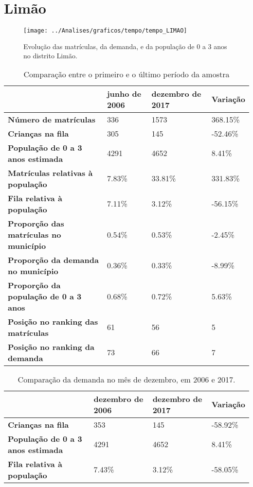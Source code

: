 \section{Limão}
\begin{figure}[H]
\centering
\texttt{[image: ../Analises/graficos/tempo/tempo\_LIMAO]}
\caption{Evolução das matrículas, da demanda, e da população de 0 a 3 anos no distrito Limão.}
\end{figure}
\begin{table}[H]
\begin{tabular}{|l|l|l|l|}
\hline
\textbf{}                                      & \textbf{junho de 2006}       & \textbf{dezembro de 2017}    & \textbf{Variação} \\ \hline
\textbf{Número de matrículas}                  & 336 & 1573 & 368.15\% \\ \hline
\textbf{Crianças na fila}                      & 305 & 145 & -52.46\% \\ \hline
\textbf{População de 0 a 3 anos estimada}      & 4291 & 4652 & 8.41\% \\ \hline
\textbf{Matrículas relativas à população}      & 7.83\% & 33.81\% & 331.83\% \\ \hline
\textbf{Fila relativa à população}             & 7.11\% & 3.12\% & -56.15\% \\ \hline
\textbf{Proporção das matrículas no município} & 0.54\% & 0.53\% & -2.45\% \\ \hline
\textbf{Proporção da demanda no município}     & 0.36\% & 0.33\% & -8.99\% \\ \hline
\textbf{Proporção da população de 0 a 3 anos}  & 0.68\% & 0.72\% & 5.63\% \\ \hline
\textbf{Posição no ranking das matrículas}     & 61 & 56 & 5 \\ \hline
\textbf{Posição no ranking da demanda}         & 73 & 66 & 7 \\ \hline
\end{tabular}
\caption{Comparação entre o primeiro e o último período da amostra}
\end{table}
\begin{table}[H]
\begin{tabular}{|l|l|l|l|}
\hline
\textbf{}                                 & \textbf{dezembro de 2006} & \textbf{dezembro de 2017} & \textbf{Variação} \\ \hline
\textbf{Crianças na fila}                      & 353 & 145 & -58.92\% \\ \hline
\textbf{População de 0 a 3 anos estimada}      & 4291 & 4652 & 8.41\% \\ \hline
\textbf{Fila relativa à população}             & 7.43\% & 3.12\% & -58.05\% \\ \hline
\end{tabular}
\caption{Comparação da demanda no mês de dezembro, em 2006 e 2017.}
\end{table}
